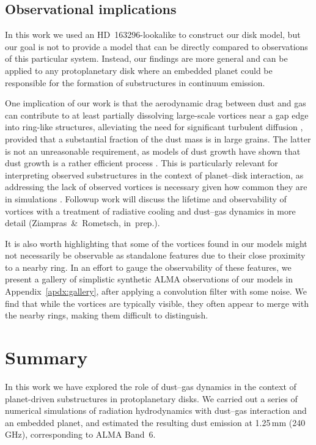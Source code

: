 \documentclass[fleqn,usenatbib,useAMS]{mnras}
\begin{document}
\subsection{Observational implications}

In this work we used an HD~163296-lookalike to construct our disk model, but our goal is not to provide a model that can be directly compared to observations of this particular system. Instead, our findings are more general and can be applied to any protoplanetary disk where an embedded planet could be responsible for the formation of substructures in continuum emission.

One implication of our work is that the aerodynamic drag between dust and gas can contribute to at least partially dissolving large-scale vortices near a gap edge into ring-like structures, alleviating the need for significant turbulent diffusion \citep[see also][]{raettig-etal-2015,lyra-etal-2018,lovascio-etal-2022}, provided that a substantial fraction of the dust mass is in large grains. The latter is not an unreasonable requirement, as models of dust growth have shown that dust growth is a rather efficient process \citep[e.g.,][]{birnstiel-2023}. This is particularly relevant for interpreting observed substructures in the context of planet--disk interaction, as addressing the lack of observed vortices is necessary given how common they are in simulations \citep[e.g.,][]{hammer-etal-2017,hammer-etal-2019,hammer-etal-2021,rometsch-etal-2021,fung-ono-2021,chang-etal-2023}. Followup work will discuss the lifetime and observability of vortices with a treatment of radiative cooling and dust--gas dynamics in more detail (Ziampras~\&~Rometsch, in~prep.).

It is also worth highlighting that some of the vortices found in our models might not necessarily be observable as standalone features due to their close proximity to a nearby ring. In an effort to gauge the observability of these features, we present a gallery of simplistic synthetic ALMA observations of our models in Appendix~\ref{apdx:gallery}, after applying a convolution filter with some noise. We find that while the vortices are typically visible, they often appear to merge with the nearby rings, making them difficult to distinguish.

\section{Summary}
\label{sec:summary}

In this work we have explored the role of dust--gas dynamics in the context of planet-driven substructures in protoplanetary disks. We carried out a series of numerical simulations of radiation hydrodynamics with dust--gas interaction and an embedded planet, and estimated the resulting dust emission at 1.25\,mm (240\,GHz), corresponding to ALMA Band~6.
\end{document}
